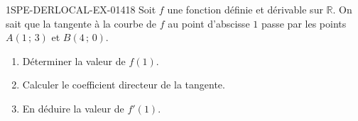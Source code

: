 \begin{exercice}{1SPE-DERLOCAL-EX-014}{1}{8}
Soit $f$ une fonction définie et dérivable sur $\mathbb{R}$. On sait que la tangente à la courbe de $f$ au point d'abscisse $1$ passe par les points $A(1\,;\,3)$ et $B(4\,;\,0)$.

\begin{enumerate}
  \item Déterminer la valeur de $f(1)$.
  \item Calculer le coefficient directeur de la tangente.
  \item En déduire la valeur de $f'(1)$.
\end{enumerate}
\end{exercice}

